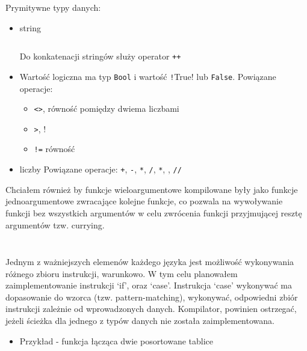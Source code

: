 \documentclass{article}
\begin{document}
Prymitywne typy danych:
\begin{itemize}
  \item string
        \inputminted{uwu.py -x}{examples/string.uwu}
        Do konkatenacji stringów służy operator \texttt{++}
  \item Wartość logiczna ma typ \texttt{Bool} i wartość \texttt!True! lub \texttt{False}.
        Powiązane operacje:
        \begin{itemize}
          \item \texttt{<>}, równość pomiędzy dwiema liczbami
          \item \texttt{>}, \texttt{}!
          \item \texttt{!=} równość
        \end{itemize}
  \item liczby
        Powiązane operacje: \texttt{+}, \texttt{-}, \texttt{*}, \texttt{/}, \texttt{*}, \texttt{}, \texttt{//}
\end{itemize}

\newpage
Chciałem również by funkcje wieloargumentowe kompilowane były jako funkcje jednoargumentowe zwracające kolejne funkcje, co pozwala na wywoływanie funkcji bez wszystkich argumentów w celu zwrócenia funkcji przyjmującej resztę argumentów tzw. currying.

\inputminted[firstline=15]{uwu.py -x}{examples/currying.uwu}
\inputminted[firstline=15]{javascript}{examples/currying.uwu.js}


Jednym z ważniejszych elemenów każdego języka jest możliwość wykonywania różnego zbioru instrukcji, warunkowo. W tym celu planowałem zaimplementowanie instrukcji `if', oraz `case'. Instrukcja `case' wykonywać ma dopasowanie do wzorca (tzw. pattern-matching), wykonywać, odpowiedni zbiór instrukcji zależnie od wprowadzonych danych. Kompilator, powinien ostrzegać, jeżeli ścieżka dla jednego z typów danych nie została zaimplementowana.

\begin{itemize}
  \newpage
  \item Przykład - funkcja łącząca dwie posortowane tablice
        \inputminted[firstline=25]{uwu.py -x}{examples/merge.uwu}
        \inputminted[firstline=20]{javascript}{examples/merge.uwu.js}
\end{itemize}
\end{document}
